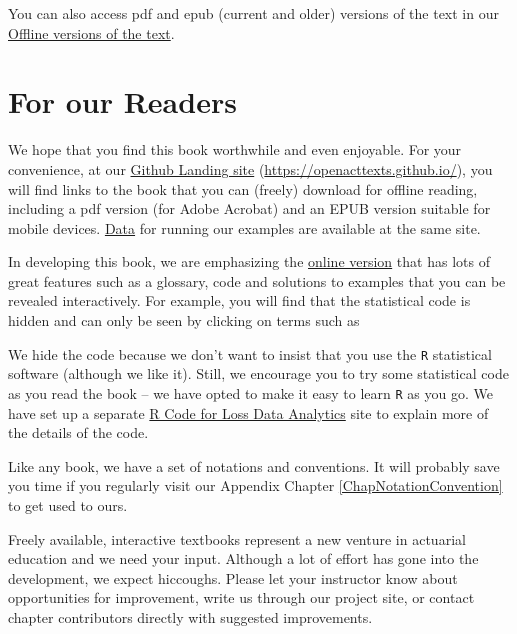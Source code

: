 \documentclass[
]{book}
\begin{document}
You can also access pdf and epub (current and older) versions of the text in our \href{https://ewfrees.github.io/Loss-Data-Analytics/DownloadOffline.html}{Offline versions of the text}.

\hypertarget{for-our-readers}{%
\section*{For our Readers}\label{for-our-readers}}

We hope that you find this book worthwhile and even enjoyable. For your convenience, at our \href{https://openacttexts.github.io/}{Github Landing site} (\url{https://openacttexts.github.io/}), you will find links to the book that you can (freely) download for offline reading, including a pdf version (for Adobe Acrobat) and an EPUB version suitable for mobile devices. \href{https://github.com/OpenActTexts/Loss-Data-Analytics/tree/master/Data}{Data} for running our examples are available at the same site.

In developing this book, we are emphasizing the \href{https://openacttexts.github.io/Loss-Data-Analytics/index.html}{online version} that has lots of great features such as a glossary, code and solutions to examples that you can be revealed interactively. For example, you will find that the statistical code is hidden and can only be seen by clicking on terms such as

We hide the code because we don't want to insist that you use the \texttt{R} statistical software (although we like it). Still, we encourage you to try some statistical code as you read the book -- we have opted to make it easy to learn \texttt{R} as you go. We have set up a separate \href{https://openacttexts.github.io/LDARcode}{R Code for Loss Data Analytics} site to explain more of the details of the code.

Like any book, we have a set of notations and conventions. It will probably save you time if you regularly visit our Appendix Chapter \ref{ChapNotationConvention} to get used to ours.

Freely available, interactive textbooks represent a new venture in actuarial education and we need your input. Although a lot of effort has gone into the development, we expect hiccoughs. Please let your instructor know about opportunities for improvement, write us through our project site, or contact chapter contributors directly with suggested improvements.
\end{document}
